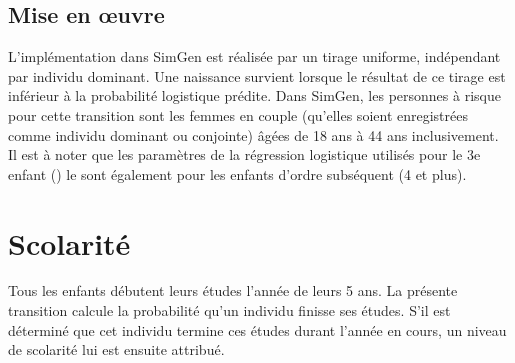 \documentclass[letterpaper,10pt,french]{sphinxmanual}
\begin{document}
\subsection{Mise en œuvre}
\label{\detokenize{methodologie:mise-en-oeuvre}}
L’implémentation dans SimGen est réalisée par un tirage uniforme,
indépendant par individu dominant. Une naissance survient lorsque le résultat de ce tirage est inférieur
à la probabilité logistique prédite.
Dans SimGen, les personnes à risque pour cette transition sont les femmes en couple
(qu’elles soient enregistrées comme individu dominant ou conjointe) âgées de 18 ans à 44 ans inclusivement.
Il est à noter que les paramètres de la régression logistique utilisés pour le 3e enfant () le sont également pour les enfants d’ordre subséquent (4 et plus).


\section{Scolarité}
\label{\detokenize{methodologie:scolarite}}
Tous les enfants débutent leurs études l’année de leurs 5 ans.
La présente transition calcule la probabilité qu’un individu finisse ses études.
S’il est déterminé que cet individu termine ces études durant l’année en cours, un niveau de scolarité lui est ensuite attribué.
\end{document}
